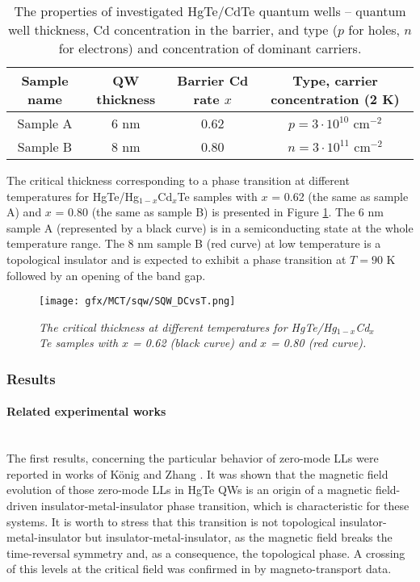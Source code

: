 \documentclass[titlepage,a4paper]{book}
\newcommand{\wciecie}{\quad\phantom{v}}
\newcommand{\myparagraph}[1]{\paragraph{#1}\mbox{}\\}
\begin{document}
\begin{table}[h]
\label{tab:MCT_QW_properties}
\caption{The properties of investigated HgTe/CdTe quantum wells -- quantum well thickness, Cd concentration in the barrier, and type ($p$ for holes, $n$ for electrons) and concentration of dominant carriers.}
\vspace{10pt}
\centering
\begin{tabular}{ c | c | c | c}	
\textbf{Sample name} & \textbf{QW thickness} & \textbf{Barrier Cd rate $x$} & \textbf{Type, carrier concentration (2 K)}\\
\hline\hline
Sample A & 6 nm & 0.62 & $p = 3\cdot10^{10}$ cm$^{-2}$\\ \hline
Sample B & 8 nm & 0.80 & $n = 3\cdot10^{11}$ cm$^{-2}$\\ \hline\hline 
\end{tabular}
\end{table}

The critical thickness corresponding to a phase transition at different temperatures for HgTe/Hg$_{1-x}$Cd$_{x}$Te samples with $x$ = 0.62 (the same as sample A) and $x$ = 0.80 (the same as sample B) is presented in Figure \ref{fig:SQW_DCvsT}. The 6 nm sample A (represented by a black curve) is in a semiconducting state at the whole temperature range. The 8 nm sample B (red curve) at low temperature is a topological insulator and is expected to exhibit a phase transition at $T = 90$ K followed by an opening of the band gap.

\begin{figure}[H]
	\centering
	\texttt{[image: gfx/MCT/sqw/SQW\_DCvsT.png]}
	\vspace{-10pt}
	\caption{\textit{The critical thickness at different temperatures for HgTe/Hg$_{1-x}$Cd$_{x}$Te samples with $x$ = 0.62 (black curve) and $x$ = 0.80 (red curve).}}
	\label{fig:SQW_DCvsT}
\end{figure} 

\subsubsection{Results}
\label{sec:MCT_QW}
\myparagraph{Related experimental works}
\wciecie
The first results, concerning the particular behavior of zero-mode LLs were reported in works of König \cite{Konig_Topology} and Zhang \cite{Zhang_Topology}. It was shown that the magnetic field evolution of those zero-mode LLs in HgTe QWs is an origin of a magnetic field-driven insulator-metal-insulator phase transition, which is characteristic for these systems. It is worth to stress that this transition is not topological insulator-metal-insulator but insulator-metal-insulator, as the magnetic field breaks the time-reversal symmetry and, as a consequence, the topological phase. A crossing of this levels at the critical field was confirmed in \cite{Konig_Topology} by magneto-transport data.
\end{document}
